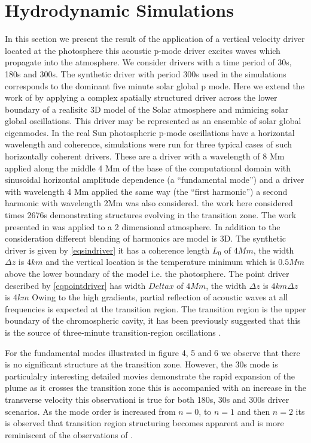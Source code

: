 \documentclass{aa}
\begin{document}


\section{Hydrodynamic Simulations}

In this section we present the result of the application of a vertical velocity driver located at the photosphere this acoustic p-mode driver excites waves which propagate into the atmosphere. We consider drivers with a time period of 30s, 180s and 300s. The synthetic driver with period 300s used in the simulations corresponds to the dominant five minute solar global p mode. Here we extend the  work of \cite{Malins2007A} by applying a complex spatially structured driver across the lower boundary of a realisitc 3D model of the Solar atmosphere and mimicing solar global oscillations. This driver may be represented as an ensemble of solar global eigenmodes.  In the real Sun photospheric p-mode oscillations have a horizontal wavelength and coherence, simulations were run for three typical cases of such horizontally coherent drivers. These are a driver with a wavelength of 8 Mm applied along the middle 4 Mm of the base of the computational domain with sinusoidal horizontal amplitude dependence (a “fundamental mode”) and a driver with wavelength 4 Mm applied the same way (the “first harmonic”) a second harmonic with wavelength 2Mm was also considered. \cite{Malins2007A} the work here considered times 2676s demonstrating structures evolving in the transition zone. The work presented in  \cite{Malins2007A} was applied to a 2 dimensional atmosphere. In addition to the consideration different blending of harmonics are model is 3D. The synthetic driver is given by \eqref{eqsindriver} it has a coherence length $L_{0}$ of $4Mm$, the width $\Delta z$  is $4km$ and the vertical location is the temperature minimum which is $0.5Mm$ above the lower boundary of the model i.e. the photosphere. The point driver described by \eqref{eqpointdriver} has width  $Delta x$ of $4Mm$, the width $\Delta z$  is $4km$$\Delta z$  is $4km$
Owing to the high gradients, partial reflection of acoustic waves at all frequencies is expected at the transition region. The transition region is the upper boundary of the chromospheric cavity, it has been previously suggested that this is the source of three-minute transition-region oscillations \cite{Leibacher1982}.

For the fundamental modes  illustrated in figure 4, 5 and 6 we observe that there is no significant structure at the transition zone. However, the 30s mode is particulalry interesting detailed movies demonstrate the rapid expansion of the plume as it crosses the transition zone this is accompanied with an increase in the transverse velocity this observationi is true for both 180s, 30s and 300s driver scenarios. As the mode order is increased from $n=0$, to $n=1$ and then $n=2$ its is observed that transition region structuring becomes apparent and is more reminiscent of the observations of \cite{Malins2007B}.
\end{document}
